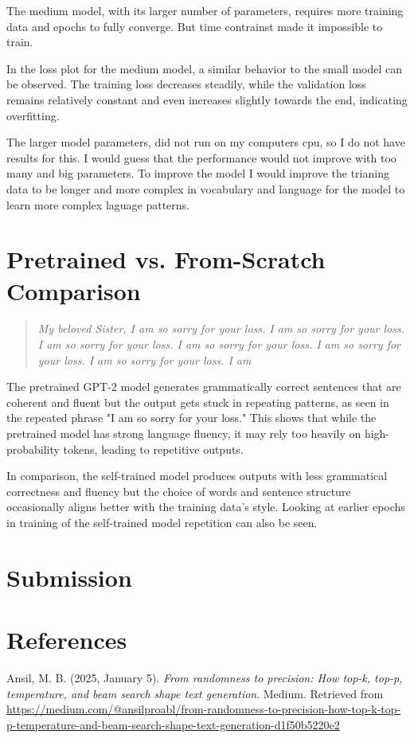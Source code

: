 \documentclass[11pt,a4paper]{article}
\begin{document}
The medium model, with its larger number of parameters, requires more training 
data and epochs to fully converge. But time contrainst made it impossible to train.

In the loss plot for the medium model, a similar behavior to the small model can be observed. 
The training loss decreases steadily, while the 
validation loss remains relatively constant and even increases slightly towards the end, indicating overfitting. 

The larger model parameters, did not run on my computers cpu, so I do not have results for this. I would guess that the performance would not improve with too many and big parameters.
To improve the model I would improve the trianing data to be longer and more complex in vocabulary and language for the model to learn more complex laguage patterns.
\section{Pretrained vs. From-Scratch Comparison}
\begin{quote}
\textit{
My beloved Sister, I am so sorry for your loss. I am so sorry for your loss. I am so sorry for your loss. I am so sorry for your loss. I am so sorry for your loss. I am so sorry for your loss. I am
} \\
\end{quote}

The pretrained GPT-2 model generates grammatically correct sentences that are coherent and fluent but 
the output gets stuck in repeating patterns, as seen in the repeated phrase "I am so sorry for your loss." 
This shows that while the pretrained model has strong language fluency, it may rely too heavily on high-probability tokens, leading to repetitive outputs.

In comparison, the self-trained model produces outputs with less grammatical correctness and fluency but
the choice of words and sentence structure occasionally aligns better with the training data's style. 
Looking at earlier epochs in training of the self-trained model repetition can also be seen.

\section{Submission}


\newpage
\section*{References}

Ansil, M. B. (2025, January 5). \textit{From randomness to precision: How top-k, top-p, temperature, and beam 
search shape text generation}. Medium. Retrieved from 
\url{https://medium.com/@ansilproabl/from-randomness-to-precision-how-top-k-top-p-temperature-and-beam-search-shape-text-generation-d1f50b5220e2}
\end{document}
